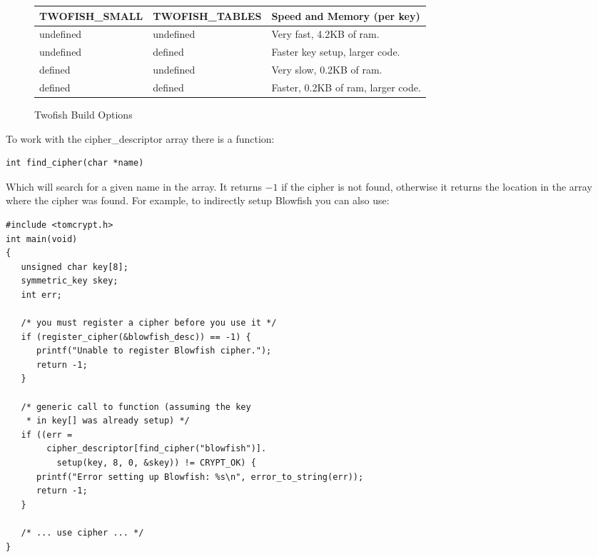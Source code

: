 \documentclass[synpaper]{book}
\begin{document}
\begin{small}
\begin{enumerate}
\begin{figure}[hpbt]
  
\begin{small}
\begin{center}
\begin{tabular}{|l|l|l|}
\hline \textbf{TWOFISH\_SMALL} & \textbf{TWOFISH\_TABLES} & \textbf{Speed and Memory (per key)} \\
\hline undefined & undefined & Very fast, 4.2KB of ram. \\
\hline undefined & defined & Faster key setup, larger code. \\
\hline defined & undefined & Very slow, 0.2KB of ram. \\
\hline defined & defined & Faster, 0.2KB of ram, larger code. \\
\hline
\end{tabular}
\end{center}
\end{small}
\caption{Twofish Build Options}
\label{fig:twofishopts}
\end{figure}
\end{enumerate}
\end{small}

To work with the cipher\_descriptor array there is a function:
\begin{verbatim}
int find_cipher(char *name)
\end{verbatim}
Which will search for a given name in the array.  It returns $-1$ if the cipher is not found, otherwise it returns
the location in the array where the cipher was found.  For example, to indirectly setup Blowfish you can also use:
\begin{small}
  
\begin{verbatim}
#include <tomcrypt.h>
int main(void)
{
   unsigned char key[8];
   symmetric_key skey;
   int err;

   /* you must register a cipher before you use it */
   if (register_cipher(&blowfish_desc)) == -1) {
      printf("Unable to register Blowfish cipher.");
      return -1;
   }

   /* generic call to function (assuming the key 
    * in key[] was already setup) */
   if ((err = 
        cipher_descriptor[find_cipher("blowfish")].
          setup(key, 8, 0, &skey)) != CRYPT_OK) {
      printf("Error setting up Blowfish: %s\n", error_to_string(err));
      return -1;
   }

   /* ... use cipher ... */
}
\end{verbatim}
\end{small}
\end{document}
